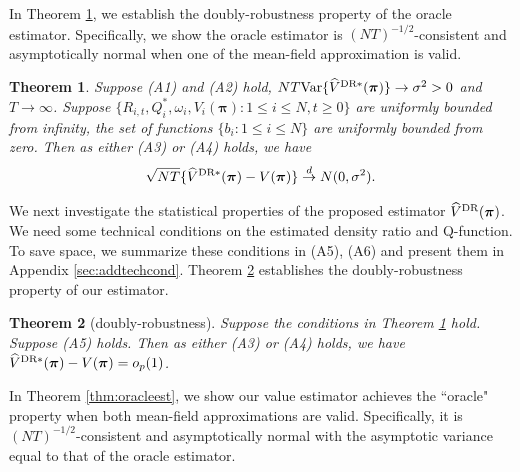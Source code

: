 \documentclass{article}
\newcommand{\Var}{{\mbox{Var}}}
\newtheorem{thm}{Theorem}
\begin{document}
In Theorem \ref{thm:oracle}, we establish the doubly-robustness property of the oracle estimator. Specifically, we show the oracle estimator is $(NT)^{-1/2}$-consistent and asymptotically normal when one of the mean-field approximation is valid. \vspace{-0.2cm}

\begin{thm}\label{thm:oracle}
	Suppose (A1) and (A2) hold, $ NT \Var\{\widehat{V}^{\hbox{\scriptsize{DR}}*}(\bm{\pi})\}\to \sigma^2>0$ and $T\to \infty$. Suppose $\{R_{i,t}, Q_i^*, \omega_{i}, V_i(\bm{\pi}):1\le i\le N,t\ge 0\}$ are uniformly bounded from infinity, the set of functions $\{b_i:1\le i\le N\}$ are uniformly bounded from zero. Then as either (A3) or (A4) holds, we have
	\vspace{-0.2cm}
	\begin{eqnarray*}
		\sqrt{NT} \{\widehat{V}^{\hbox{\scriptsize{DR}}*}(\bm{\pi})-V(\bm{\pi})\}\stackrel{d}{\to} N(0,\sigma^2). 
	\end{eqnarray*}
\end{thm}\vspace{-0.3cm}


We next investigate the statistical properties of the proposed estimator $\widehat{V}^{\hbox{\scriptsize{DR}}}(\bm{\pi})$. We need some technical conditions on the estimated density ratio and Q-function. To save space, we summarize these conditions in (A5), (A6) and present them in Appendix \ref{sec:addtechcond}. Theorem \ref{thm:double} establishes the doubly-robustness property of our estimator. 

\vspace{-0.2cm}
\begin{thm}[doubly-robustness]\label{thm:double}
	Suppose the conditions in Theorem \ref{thm:oracle} hold. Suppose (A5) holds. Then as either (A3) or (A4) holds, we have $\widehat{V}^{\hbox{\scriptsize{DR}}*}(\bm{\pi})-V(\bm{\pi})=o_p(1)$. 
\end{thm}\vspace{-0.2cm}

In Theorem \ref{thm:oracleest}, we show our value estimator achieves the ``oracle" property when both mean-field approximations are valid. Specifically, it is $(NT)^{-1/2}$-consistent and asymptotically normal with the asymptotic variance equal to that of the oracle estimator. 
\vspace{-0.2cm}
\end{document}
